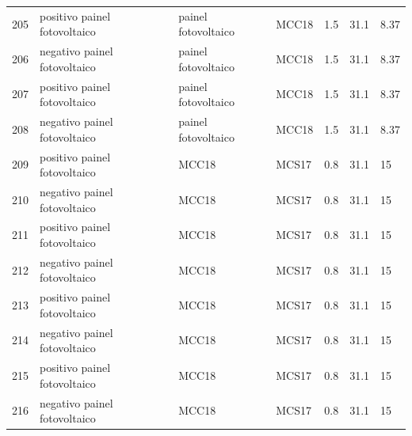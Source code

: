 \documentclass{article}
\begin{document}
\begin{landscape}
\begin{table}[]
\begin{tabular}{lllllll}
205    & positivo painel fotovoltaico & painel fotovoltaico & MCC18            & 1.5             & 31.1              & 8.37                 \\
206    & negativo painel fotovoltaico & painel fotovoltaico & MCC18            & 1.5             & 31.1              & 8.37                 \\
207    & positivo painel fotovoltaico & painel fotovoltaico & MCC18            & 1.5             & 31.1              & 8.37                 \\
208    & negativo painel fotovoltaico & painel fotovoltaico & MCC18            & 1.5             & 31.1              & 8.37                 \\
209    & positivo painel fotovoltaico & MCC18               & MCS17            & 0.8             & 31.1              & 15                   \\
210    & negativo painel fotovoltaico & MCC18               & MCS17            & 0.8             & 31.1              & 15                   \\
211    & positivo painel fotovoltaico & MCC18               & MCS17            & 0.8             & 31.1              & 15                   \\
212    & negativo painel fotovoltaico & MCC18               & MCS17            & 0.8             & 31.1              & 15                   \\
213    & positivo painel fotovoltaico & MCC18               & MCS17            & 0.8             & 31.1              & 15                   \\
214    & negativo painel fotovoltaico & MCC18               & MCS17            & 0.8             & 31.1              & 15                   \\
215    & positivo painel fotovoltaico & MCC18               & MCS17            & 0.8             & 31.1              & 15                   \\
216    & negativo painel fotovoltaico & MCC18               & MCS17            & 0.8             & 31.1              & 15                  
\end{tabular}
\end{table}
\end{landscape}
\end{document}
